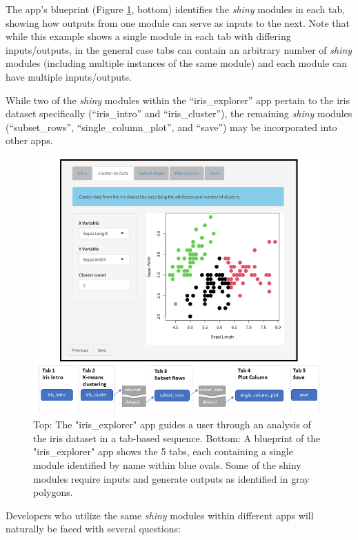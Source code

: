 The app's blueprint (Figure \ref{fig:fig2}, bottom) identifies the \emph{shiny} modules in each tab, showing how outputs from one module can serve as inputs to the next. Note that while this example shows a single module in each tab with differing inputs/outputs, in the general case tabs can contain an arbitrary number of \emph{shiny} modules (including multiple instances of the same module) and each module can have multiple inputs/outputs.

While two of the \emph{shiny} modules within the ``iris\_explorer'' app pertain to the iris dataset specifically (``iris\_intro'' and ``iris\_cluster''), the remaining \emph{shiny} modules (``subset\_rows'', ``single\_column\_plot'', and ``save'') may be incorporated into other apps.

\begin{figure}[h]
\includegraphics[width=1\linewidth]{images/figure2} \caption{Top:  The "iris\_explorer" app guides a user through an analysis of the iris dataset in a tab-based sequence.  Bottom:  A blueprint of the "iris\_explorer" app shows the 5 tabs, each containing a single module identified by name within blue ovals. Some of the shiny modules require inputs and generate outputs as identified in gray polygons.}\label{fig:fig2}
\end{figure}

\newpage

Developers who utilize the same \emph{shiny} modules within different apps will naturally be faced with several questions:

